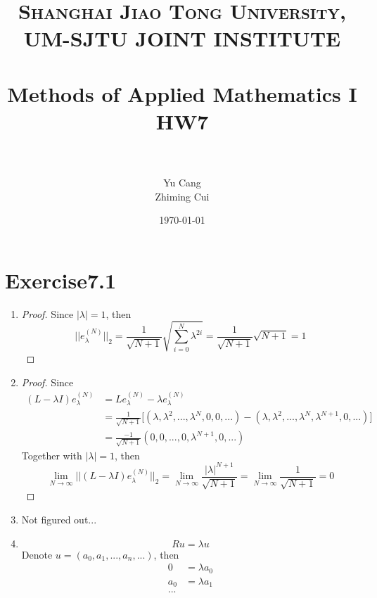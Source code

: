 \documentclass[paper=a4, fontsize=11pt]{scrartcl} %
\title{	
\normalfont \normalsize 
\textsc{Shanghai Jiao Tong University, UM-SJTU JOINT INSTITUTE} \\ [25pt] %
\horrule{0.5pt} \\[0.4cm] %
\huge Methods of Applied Mathematics I\\ HW7 \\ %
\horrule{2pt} \\[0.5cm] %
}
\author{Yu Cang \quad 018370210001\\ Zhiming Cui \quad 017370910006} %
\date{\normalsize \today} %
\numberwithin{equation}{section} %
\numberwithin{figure}{section} %
\numberwithin{table}{section} %
\begin{document}
\maketitle %

\section{Exercise7.1}
	\begin{enumerate}
		\item 
			\begin{proof}
				Since $|\lambda|=1$, then
				\begin{equation}
					||e_\lambda^{(N)}||_2 = \frac{1}{\sqrt{N+1}} \sqrt{\sum_{i=0}^{N} \lambda^{2i}} =  \frac{1}{\sqrt{N+1}} \sqrt{N+1} = 1
				\end{equation}
			\end{proof}
		\item 
			\begin{proof}
				Since
				\begin{equation}
					\begin{aligned}
						(L - \lambda I) e_\lambda^{(N)} 
						& = L e_\lambda^{(N)} - \lambda e_\lambda^{(N)}\\
						& = \frac{1}{\sqrt{N+1}}\big[(\lambda, \lambda^2, ... , \lambda^N, 0, 0, ...) - (\lambda, \lambda^2, ... , \lambda^N, \lambda^{N+1}, 0, ...)\big]\\
						& = \frac{-1}{\sqrt{N+1}}(0, 0, ..., 0, \lambda^{N+1}, 0, ...)
					\end{aligned}
				\end{equation}
				Together with  $|\lambda|=1$, then
				\begin{equation}
				\lim\limits_{N\rightarrow\infty} ||(L - \lambda I) e_\lambda^{(N)}||_2 = \lim\limits_{N\rightarrow\infty} \frac{|\lambda|^{N+1}}{\sqrt{N+1}} = \lim\limits_{N\rightarrow\infty} \frac{1}{\sqrt{N+1}} = 0
				\end{equation}
			\end{proof}
		\item 
			Not figured out...
		\item
			\begin{equation}
				Ru = \lambda u
			\end{equation} 
			Denote $u = (a_0, a_1, ..., a_n, ...)$, then
			\begin{equation}
				\begin{aligned}
					0 &= \lambda a_0\\
					a_0 &= \lambda a_1\\
					...\\
				\end{aligned}
			\end{equation}
	\end{enumerate}
\end{document}
